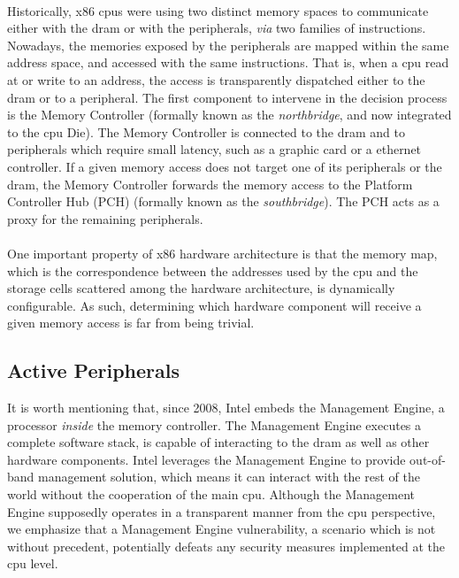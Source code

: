 
\paragraph{}
%
Historically, x86 \acp{cpu} were using two distinct memory spaces to communicate
either with the \ac{dram} or with the peripherals, \emph{via} two families of
instructions.
%
Nowadays, the memories exposed by the peripherals are mapped within the same
address space, and accessed with the same instructions.
%
That is, when a \ac{cpu} read at or write to an address, the access is
transparently dispatched either to the \ac{dram} or to a peripheral.
%
The first component to intervene in the decision process is the Memory
Controller (formally known as the \emph{northbridge}, and now integrated to the
\ac{cpu} Die).
%
The Memory Controller is connected to the \ac{dram} and to peripherals which
require small latency, such as a graphic card or a ethernet controller.
%
If a given memory access does not target one of its peripherals or the
\ac{dram}, the Memory Controller forwards the memory access to the Platform
Controller Hub (PCH) (formally known as the \emph{southbridge}).
%
The PCH acts as a proxy for the remaining peripherals.

\paragraph{}
%
One important property of x86 hardware architecture is that the memory map,
which is the correspondence between the addresses used by the \ac{cpu} and the
storage cells scattered among the hardware architecture, is dynamically
configurable.
%
As such, determining which hardware component will receive a given memory access
is far from being trivial.

\subsection{Active Peripherals}
\label{subsec:usecase:perif}

It is worth mentioning that, since 2008, Intel embeds the Management Engine, a
processor \emph{inside} the memory controller.
%
The Management Engine executes a complete software stack, is capable of
interacting to the \ac{dram} as well as other hardware components.
%
Intel leverages the Management Engine to provide out-of-band management
solution, which means it can interact with the rest of the world without the
cooperation of the main \ac{cpu}.
%
Although the Management Engine supposedly operates in a transparent manner from
the \ac{cpu} perspective, we emphasize that a Management Engine vulnerability, a
scenario which is not without precedent, potentially defeats any security
measures implemented at the \ac{cpu} level.

